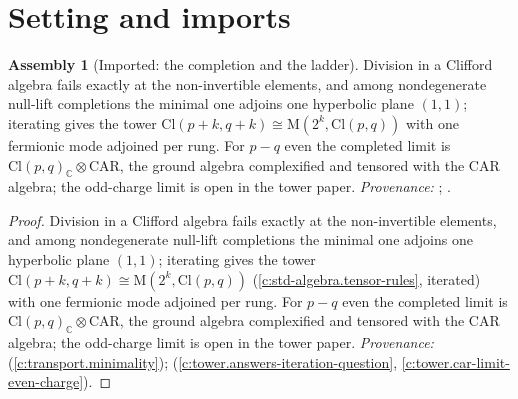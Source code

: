 \documentclass[11pt]{article}
\theoremstyle{definition}
\newtheorem{assembled}[theorem]{Assembly}
\theoremstyle{plain}
\providecommand{\C}{}\renewcommand{\C}{\mathbb{C}}
\providecommand{\Cl}{}\renewcommand{\Cl}{\mathrm{Cl}}
\providecommand{\Mat}{}\renewcommand{\Mat}{\mathrm{M}}
\begin{document}
\section{Setting and imports}

\begin{assembled}[Imported: the completion and the ladder]\label{c:one-relation.imported-completion-ladder}
Division in a Clifford algebra fails exactly at the non-invertible elements, and among nondegenerate null-lift completions the minimal one adjoins one hyperbolic plane $(1,1)$; iterating gives the tower $\Cl(p+k, q+k) \cong \Mat(2^{k}, \Cl(p,q))$ with one fermionic mode adjoined per rung. For $p - q$ even the completed limit is $\Cl(p,q)_{\C} \otimes \mathrm{CAR}$, the ground algebra complexified and tensored with the CAR algebra; the odd-charge limit is open in the tower paper. \emph{Provenance:} \cite[Thm.~4.13]{ButlerT1}; \cite[Thm.~5.6, Question~5.8, Cor.~6.2]{ButlerT3}.
\end{assembled}
\begin{proof}
Division in a Clifford algebra fails exactly at the non-invertible elements, and among nondegenerate null-lift completions the minimal one adjoins one hyperbolic plane $(1,1)$; iterating gives the tower $\Cl(p+k, q+k) \cong \Mat(2^{k}, \Cl(p,q))$ (\ref{c:std-algebra.tensor-rules}, iterated) with one fermionic mode adjoined per rung. For $p - q$ even the completed limit is $\Cl(p,q)_{\C} \otimes \mathrm{CAR}$, the ground algebra complexified and tensored with the CAR algebra; the odd-charge limit is open in the tower paper. \emph{Provenance:} \cite[Thm.~4.13]{ButlerT1} (\ref{c:transport.minimality}); \cite[Thm.~5.6, Question~5.8, Cor.~6.2]{ButlerT3} (\ref{c:tower.answers-iteration-question}, \ref{c:tower.car-limit-even-charge}).

\end{proof}
\end{document}
